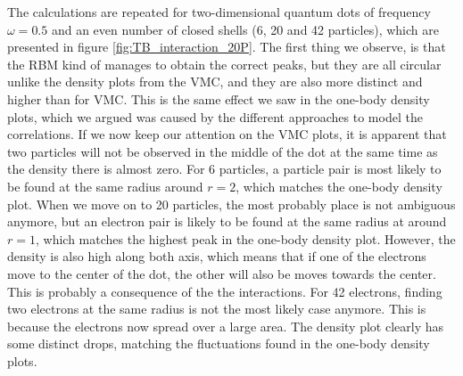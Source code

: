 The calculations are repeated for two-dimensional quantum dots of frequency $\omega=0.5$ and an even number of closed shells (6, 20 and 42 particles), which are presented in figure \eqref{fig:TB_interaction_20P}. The first thing we observe, is that the RBM kind of manages to obtain the correct peaks, but they are all circular unlike the density plots from the VMC, and they are also more distinct and higher than for VMC. This is the same effect we saw in the one-body density plots, which we argued was caused by the different approaches to model the correlations. If we now keep our attention on the VMC plots, it is apparent that two particles will not be observed in the middle of the dot at the same time as the density there is almost zero. For 6 particles, a particle pair is most likely to be found at the same radius around $r=2$, which matches the one-body density plot. When we move on to 20 particles, the most probably place is not ambiguous anymore, but an electron pair is likely to be found at the same radius at around $r=1$, which matches the highest peak in the one-body density plot. However, the density is also high along both axis, which means that if one of the electrons move to the center of the dot, the other will also be moves towards the center. This is probably a consequence of the the interactions. For 42 electrons, finding two electrons at the same radius is not the most likely case anymore. This is because the electrons now spread over a large area. The density plot clearly has some distinct drops, matching the fluctuations found in the one-body density plots. 

